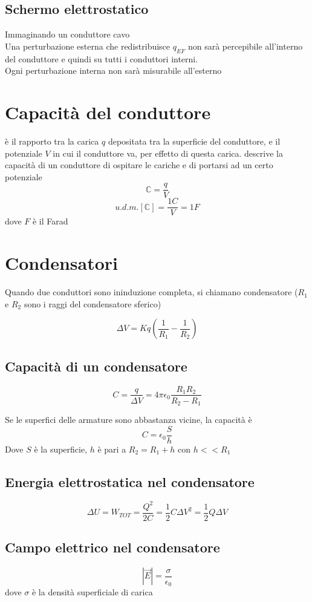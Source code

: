 \documentclass[a4paper]{report}
\begin{document}
  \subsection{Schermo elettrostatico}
  Immaginando un conduttore cavo\\
  Una perturbazione esterna che redistribuisce $q_{EF}$ non sarà percepibile all'interno del conduttore e quindi su tutti i conduttori interni.\\
  Ogni perturbazione interna non sarà misurabile all'esterno

  \section{Capacità del conduttore}
  è il rapporto tra la carica $q$ depositata tra la superficie del conduttore, e il potenziale $V$ in cui il conduttore va, per effetto di questa carica. descrive la capacità di un conduttore di ospitare le cariche e di portarsi ad un certo potenziale
  $$ \mathbb{C} = \frac{q}{V} $$
  $$u.d.m.[\mathbb{C}] = \frac{1C}{V} = 1F$$
  dove $ F $ è il Farad

  \section{Condensatori}
  Quando due conduttori sono ininduzione completa, si chiamano condensatore ($R_1$ e $R_2$ sono i raggi del condensatore sferico)

  $$ \Delta V = Kq (\frac{1}{R_1} - \frac{1}{R_2}) $$

  \subsection{Capacità di un condensatore}
  $$ C= \frac{q}{\Delta V} = 4 \pi \epsilon_0 \frac{R_1 R_2}{R_2 - R_1} $$

  Se le superfici delle armature sono abbastanza vicine, la capacità è
  $$C = \epsilon_0 \frac{S}{h}$$
  Dove $S$ è la superficie, $h$ è pari a $R_2 = R_1 + h$ con $h<<R_1$

  \subsection{Energia elettrostatica nel condensatore}
  $$ \Delta U = W_{TOT} = \frac{Q^2}{2C} = \frac{1}{2} C \Delta V^2 = \frac{1}{2} Q \Delta V $$

  \subsection{Campo elettrico nel condensatore}
  $$ |\vec{E}| = \frac{\sigma}{\epsilon_0} $$
  dove $\sigma$ è la densità superficiale di carica
\end{document}
